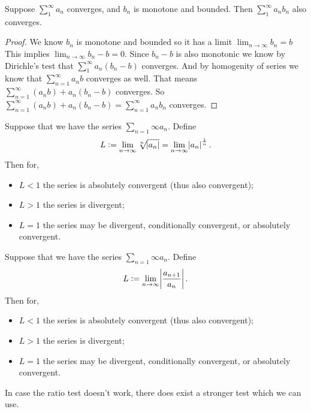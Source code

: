 \documentclass[11pt,a4paper]{article}
\begin{document}
  \begin{proposition}
	Suppose $\sum_{1}^{\infty}{a_n}$ converges, and $b_n$ is monotone and bounded.
    Then $\sum_{1}^{\infty}{a_nb_n}$ also converges.
  \end{proposition}
	\begin{proof}
		We know $b_n$ is monotone and bounded so it has a limit $\lim_{n\to\infty}{b_n}=b$
		This implies $\lim_{n\to\infty}{b_n-b}=0$. 
		Since $b_n-b$ is also monotonic we know by Dirichle's test that 
		$\sum_{1}^{\infty}{a_n(b_n-b)}$ converges. And by homogenity of series we know that
		 $\sum_{n=1}^{\infty}{a_n b}$ converges as well.
		That means $\sum_{n=1}^{\infty}{(a_n b)+a_n(b_n-b)}$ converges.
		So $\sum_{n=1}^{\infty}{(a_n b)+a_n(b_n-b)} = \sum_{n=1}^{\infty}{a_nb_n}$
    converges.
	\end{proof}

  \begin{proposition}
    Suppose that we have the series $\sum_{n=1}{\infty} a_n$.
    Define
    \[
      L :=
      \lim_{n \to \infty} \sqrt[n]{\abs{a_n}} =
      \lim_{n \to \infty} \abs{a_n}^{\frac{1}{n}}.
    \]
    Then for,
    \begin{itemize}
      \item $L < 1$ the series is absolutely convergent (thus also convergent);
      \item $L > 1$ the series is divergent;
      \item $L = 1$ the series may be divergent, conditionally convergent,
        or absolutely convergent.
    \end{itemize}
  \end{proposition}
  
  \begin{proposition}
    Suppose that we have the series $\sum_{n=1}{\infty} a_n$.
    Define
    \[
      L :=
      \lim_{n \to \infty} \abs{\frac{a_{n+1}}{a_{n}}}.
    \]
    Then for,
    \begin{itemize}
      \item $L < 1$ the series is absolutely convergent (thus also convergent);
      \item $L > 1$ the series is divergent;
      \item $L = 1$ the series may be divergent, conditionally convergent,
        or absolutely convergent.
    \end{itemize}
  \end{proposition}

  In case the ratio test doesn't work, there does exist a stronger
  test which we can use.
  
\end{document}
